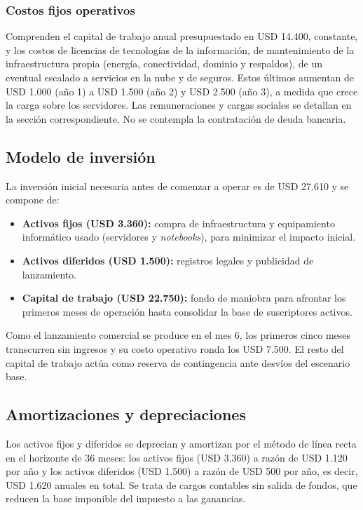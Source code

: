 \subsubsection{Costos fijos operativos}
Comprenden el capital de trabajo anual presupuestado en USD 14.400, constante, y los costos de licencias de tecnologías de la información, de mantenimiento de la infraestructura propia (energía, conectividad, dominio y respaldos), de un eventual escalado a servicios en la nube y de seguros. Estos últimos aumentan de USD 1.000 (año 1) a USD 1.500 (año 2) y USD 2.500 (año 3), a medida que crece la carga sobre los servidores. Las remuneraciones y cargas sociales se detallan en la sección correspondiente. No se contempla la contratación de deuda bancaria.

\subsection{Modelo de inversión}
La inversión inicial necesaria antes de comenzar a operar es de USD 27.610 y se compone de:
\begin{itemize}
  \item \textbf{Activos fijos (USD 3.360):} compra de infraestructura y equipamiento informático usado (servidores y \textit{notebooks}), para minimizar el impacto inicial.
  \item \textbf{Activos diferidos (USD 1.500):} registros legales y publicidad de lanzamiento.
  \item \textbf{Capital de trabajo (USD 22.750):} fondo de maniobra para afrontar los primeros meses de operación hasta consolidar la base de suscriptores activos.
\end{itemize}
Como el lanzamiento comercial se produce en el mes 6, los primeros cinco meses transcurren sin ingresos y su costo operativo ronda los USD 7.500. El resto del capital de trabajo actúa como reserva de contingencia ante desvíos del escenario base.

\subsection{Amortizaciones y depreciaciones}
Los activos fijos y diferidos se deprecian y amortizan por el método de línea recta en el horizonte de 36 meses: los activos fijos (USD 3.360) a razón de USD 1.120 por año y los activos diferidos (USD 1.500) a razón de USD 500 por año, es decir, USD 1.620 anuales en total. Se trata de cargos contables sin salida de fondos, que reducen la base imponible del impuesto a las ganancias.

